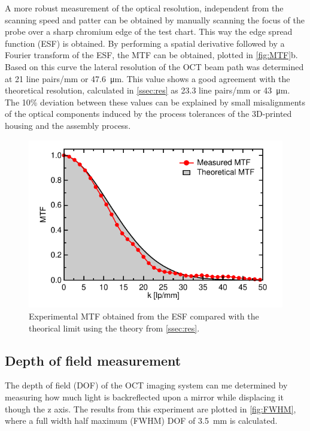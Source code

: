 \documentclass[10pt]{iopart}
\begin{document}
A more robust measurement of the optical resolution, independent from the scanning speed and patter can be obtained by manually scanning the focus of the probe over a sharp chromium edge of the test chart. This way the edge spread function (ESF) is obtained. By performing a spatial derivative followed by a Fourier transform of the ESF, the MTF can be obtained, plotted in \autoref{fig:MTF}b. Based on this curve the lateral resolution of the OCT beam path was determined at 21 line pairs/mm or \SI{47.6}{\micro\meter}. This value shows a good agreement with the theoretical resolution, calculated in \autoref{ssec:res} as 23.3 line pairs/mm or \SI{43}{\micro\meter}. The 10\% deviation between these values can be explained by small misalignments of the optical components induced by the process tolerances of the 3D-printed housing and the assembly process.
\begin{figure}[h!]\centering \includegraphics[width=\columnwidth]{figures/confRes.pdf}
      \caption{Experimental MTF obtained from the ESF compared with the theorical limit using the theory from \autoref{ssec:res}.}
      \label{fig:MTF}
\end{figure}


\subsection{Depth of field measurement}
The depth of field (DOF) of the OCT imaging system can me determined by measuring how much light is backreflected upon a mirror while displacing it though the z axis. The results from this experiment are plotted in \autoref{fig:FWHM}, where a full width half maximum (FWHM) DOF of \SI{3.5}{\milli\meter} is calculated. 
\end{document}
